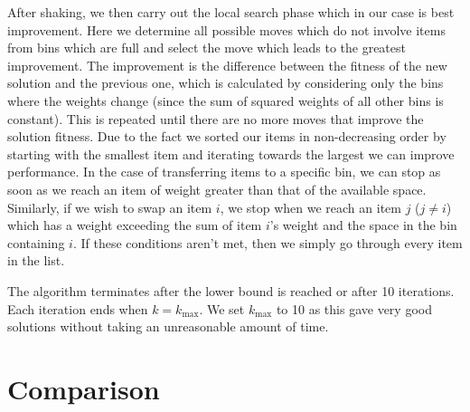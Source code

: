 \documentclass[12pt]{article}
\begin{document}
After shaking, we then carry out the local search phase which in our case is best improvement. Here we determine all possible moves which do not involve items from bins which are full and select the move which leads to the greatest improvement. The improvement is the difference between the fitness of the new solution and the previous one, which is calculated by considering only the bins where the weights change (since the sum of squared weights of all other bins is constant). This is repeated until there are no more moves that improve the solution fitness. Due to the fact we sorted our items in non-decreasing order by starting with the smallest item and iterating towards the largest we can improve performance. In the case of transferring items to a specific bin, we can stop as soon as we reach an item of weight greater than that of the available space. Similarly, if we wish to swap an item $i$, we stop when we reach an item $j$ ($j \neq i$) which has a weight exceeding the sum of item $i$'s weight and the space in the bin containing $i$. If these conditions aren’t met, then we simply go through every item in the list.   

The algorithm terminates after the lower bound is reached or after 10 iterations. Each iteration ends when $k = k_{\max}$. We set $k_{\max}$ to 10 as this gave very good solutions without taking an unreasonable amount of time. 
\section{Comparison}
\end{document}
